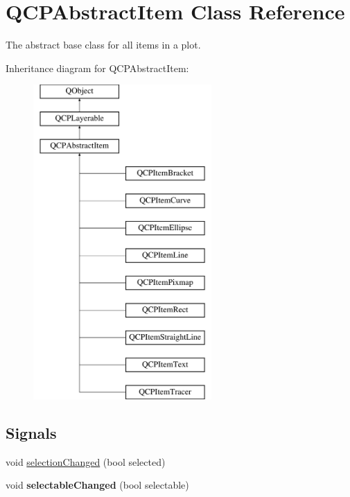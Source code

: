 \hypertarget{class_q_c_p_abstract_item}{}\section{Q\+C\+P\+Abstract\+Item Class Reference}
\label{class_q_c_p_abstract_item}


The abstract base class for all items in a plot.  


Inheritance diagram for Q\+C\+P\+Abstract\+Item\+:\begin{figure}[H]
\begin{center}
\leavevmode
\includegraphics[height=12.000000cm]{class_q_c_p_abstract_item}
\end{center}
\end{figure}
\subsection*{Signals}
\begin{DoxyCompactItemize}
\item 
void \hyperlink{class_q_c_p_abstract_item_aa5cffb034fc65dbb91c77e02c1c14251}{selection\+Changed} (bool selected)
\item 
\mbox{\label{class_q_c_p_abstract_item_a5b266c11aac61cb511901f3911dac2a3}} 
void {\bfseries selectable\+Changed} (bool selectable)
\end{DoxyCompactItemize}
